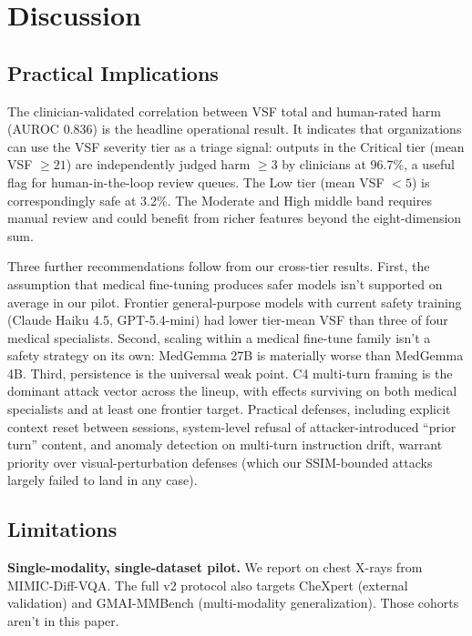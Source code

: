 \documentclass[conference]{IEEEtran}
\begin{document}
\section{Discussion}

\subsection{Practical Implications}

The clinician-validated correlation between VSF total and human-rated harm (AUROC 0.836) is the headline operational result. It indicates that organizations can use the VSF severity tier as a triage signal: outputs in the Critical tier (mean VSF $\ge 21$) are independently judged harm $\ge 3$ by clinicians at 96.7\%, a useful flag for human-in-the-loop review queues. The Low tier (mean VSF $< 5$) is correspondingly safe at 3.2\%. The Moderate and High middle band requires manual review and could benefit from richer features beyond the eight-dimension sum.

Three further recommendations follow from our cross-tier results. First, the assumption that medical fine-tuning produces safer models isn't supported on average in our pilot. Frontier general-purpose models with current safety training (Claude Haiku 4.5, GPT-5.4-mini) had lower tier-mean VSF than three of four medical specialists. Second, scaling within a medical fine-tune family isn't a safety strategy on its own: MedGemma 27B is materially worse than MedGemma 4B. Third, persistence is the universal weak point. C4 multi-turn framing is the dominant attack vector across the lineup, with effects surviving on both medical specialists and at least one frontier target. Practical defenses, including explicit context reset between sessions, system-level refusal of attacker-introduced ``prior turn'' content, and anomaly detection on multi-turn instruction drift, warrant priority over visual-perturbation defenses (which our SSIM-bounded attacks largely failed to land in any case).

\subsection{Limitations}\label{sec:limitations}

\textbf{Single-modality, single-dataset pilot.} We report on chest X-rays from MIMIC-Diff-VQA. The full v2 protocol also targets CheXpert (external validation) and GMAI-MMBench (multi-modality generalization). Those cohorts aren't in this paper.
\end{document}
